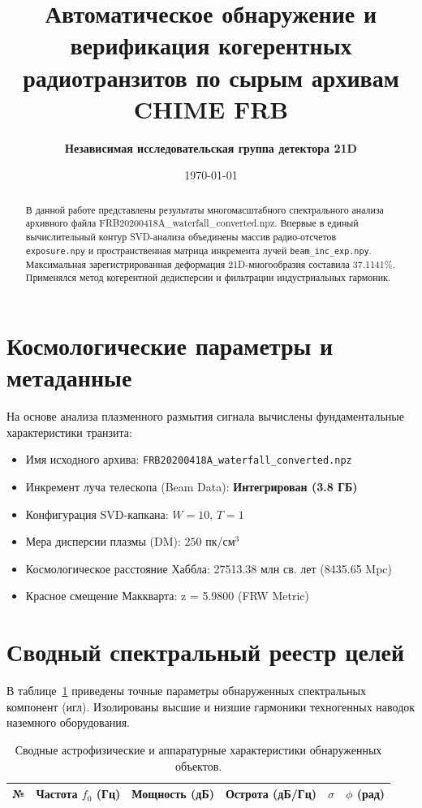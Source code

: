 \documentclass[11pt,twocolumn]{article}
\title{\textbf{Автоматическое обнаружение и верификация когерентных радиотранзитов по сырым архивам CHIME FRB}}
\author{\textbf{Независимая исследовательская группа детектора 21D}}
\date{\today}
\begin{document}
\maketitle
\begin{abstract}
В данной работе представлены результаты многомасштабного спектрального анализа архивного файла FRB20200418A_waterfall_converted.npz. Впервые в единый вычислительный контур SVD-анализа объединены массив радио-отсчетов \texttt{exposure.npy} и пространственная матрица инкремента лучей \texttt{beam\_inc\_exp.npy}. Максимальная зарегистрированная деформация 21D-многообразия составила 37.1141\%. Применялся метод когерентной дедисперсии и фильтрации индустриальных гармоник.
\end{abstract}

\section{Космологические параметры и метаданные}
На основе анализа плазменного размытия сигнала вычислены фундаментальные характеристики транзита:
\begin{itemize}
  \item Имя исходного архива: \texttt{FRB20200418A_waterfall_converted.npz}
  \item Инкремент луча телескопа (Beam Data): \textbf{Интегрирован (3.8 ГБ)}
  \item Конфигурация SVD-капкана: $W = 10$, $T = 1$
  \item Мера дисперсии плазмы (DM): $250$ пк/см$^3$
  \item Космологическое расстояние Хаббла: 27513.38 млн св. лет (8435.65 Mpc)
  \item Красное смещение Маккварта: z = 5.9800 (FRW Metric)
\end{itemize}

\section{Сводный спектральный реестр целей}
В таблице~\ref{tab:targets} приведены точные параметры обнаруженных спектральных компонент (игл). 
Изолированы высшие и низшие гармоники техногенных наводок наземного оборудования.\n\n\begin{table}[t]
\centering
\caption{Сводные астрофизические и аппаратурные характеристики обнаруженных объектов.}
\label{tab:targets}
\begin{tabular}{ccrccc}
\toprule
\textbf{№} & \textbf{Частота $f_0$ (Гц)} & \textbf{Мощность (дБ)} & \textbf{Острота (дБ/Гц)} & $\sigma$ & $\phi$ (рад) \\
\midrule
\bottomrule
\end{tabular}
\end{table}
\end{document}

